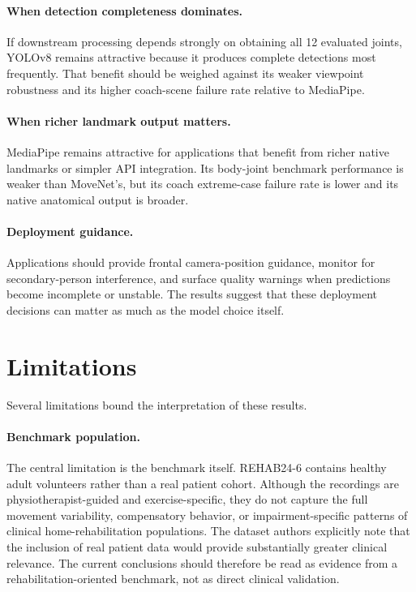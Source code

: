 \paragraph{When detection completeness dominates.}
If downstream processing depends strongly on obtaining all 12 evaluated joints, YOLOv8 remains attractive because it produces complete detections most frequently. That benefit should be weighed against its weaker viewpoint robustness and its higher coach-scene failure rate relative to MediaPipe.

\paragraph{When richer landmark output matters.}
MediaPipe remains attractive for applications that benefit from richer native landmarks or simpler API integration. Its body-joint benchmark performance is weaker than MoveNet's, but its coach extreme-case failure rate is lower and its native anatomical output is broader.

\paragraph{Deployment guidance.}
Applications should provide frontal camera-position guidance, monitor for secondary-person interference, and surface quality warnings when predictions become incomplete or unstable. The results suggest that these deployment decisions can matter as much as the model choice itself.


\section{Limitations}
\label{sec:limitations}

Several limitations bound the interpretation of these results.

\paragraph{Benchmark population.}
The central limitation is the benchmark itself. REHAB24-6 contains healthy adult volunteers rather than a real patient cohort. Although the recordings are physiotherapist-guided and exercise-specific, they do not capture the full movement variability, compensatory behavior, or impairment-specific patterns of clinical home-rehabilitation populations. The dataset authors explicitly note that the inclusion of real patient data would provide substantially greater clinical relevance. The current conclusions should therefore be read as evidence from a rehabilitation-oriented benchmark, not as direct clinical validation.

